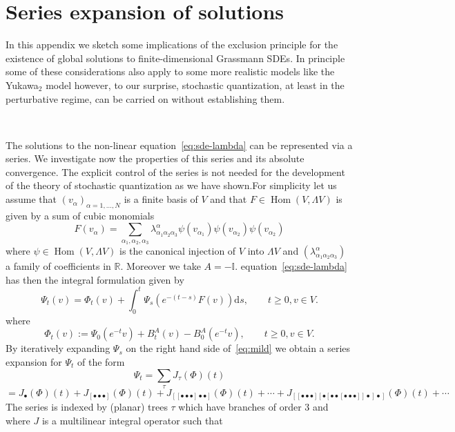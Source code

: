 \documentclass{article}
\newcommand{\assign}{:=}
\newcommand{\mathd}{\mathrm{d}}
\newcommand{\tmop}[1]{\ensuremath{\operatorname{#1}}}
\begin{document}
\section{Series expansion of solutions}\label{app:series}

In this appendix we sketch some implications of the exclusion principle for
the existence of global solutions to finite-dimensional Grassmann SDEs. In
principle some of these considerations also apply to some more realistic
models like the Yukawa$_2$ model however, to our surprise, stochastic
quantization, at least in the perturbative regime, can be carried on without
establishing them.

\

The solutions to the non-linear equation~{\eqref{eq:sde-lambda}} can be
represented via a series. We investigate now the properties of this series and
its absolute convergence. The explicit control of the series is not needed for
the development of the theory of stochastic quantization as we have
shown.\quad For simplicity let us assume that $(v_{\alpha})_{\alpha = 1,
\ldots, N}$ is a finite basis of $V$ and that $F \in \tmop{Hom} (V, \Lambda
V)$ is given by a sum of cubic monomials
\[ F (v_{\alpha}) = \sum_{\alpha_1, \alpha_2, \alpha_3}
   \lambda^{\alpha}_{\alpha_1 \alpha_2 \alpha_3} \psi (v_{\alpha_1}) \psi
   (v_{\alpha_2}) \psi (v_{\alpha_2}) \]
where $\psi \in \tmop{Hom} (V, \Lambda V)$ is the canonical injection of $V$
into $\Lambda V$ and $(\lambda^{\alpha}_{\alpha_1 \alpha_2 \alpha_3})$ a
family of coefficients in $\mathbb{R}$. Moreover we take $A = -\mathbb{I}$.
equation~{\eqref{eq:sde-lambda}} has then the integral formulation given by
\begin{equation}
  \Psi_t (v) = \Phi_t (v) + \int_0^t \Psi_s (e^{- (t - s)} F (v)) \mathd s,
  \qquad t \geqslant 0, v \in V. \label{eq:mild}
\end{equation}
where
\[ \Phi_t (v) \assign \Psi_0 (e^{- t} v) + B^A_t (v) - B^A_0 (e^{- t} v),
   \qquad t \geqslant 0, v \in V. \]
By iteratively expanding $\Psi_s$ on the right hand side of~{\eqref{eq:mild}}
we obtain a series expansion for $\Psi_t$ of the form
\[ \Psi_t = \sum_{\tau} J_{\tau} (\Phi) (t) \]
\[ = J_{\bullet} (\Phi) (t) + J_{[\bullet \bullet \bullet]} (\Phi) (t) +
   J_{[[\bullet \bullet \bullet] \bullet \bullet]} (\Phi) (t) + \cdots +
   J_{[[\bullet \bullet \bullet] [\bullet [\bullet \bullet [\bullet \bullet
   \bullet]] \bullet] \bullet]} (\Phi) (t) + \cdots \]
The series is indexed by (planar) trees $\tau$ which have branches of order 3
and where $J$ is a multilinear integral operator such that
\end{document}
